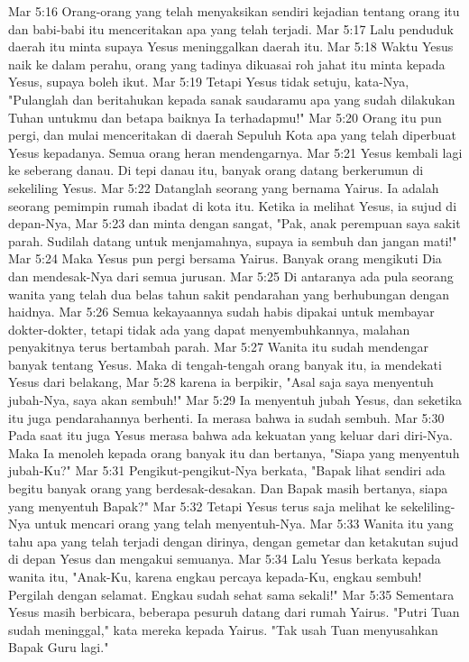 Mar 5:16  Orang-orang yang telah menyaksikan sendiri kejadian tentang orang itu dan babi-babi itu menceritakan apa yang telah terjadi.
Mar 5:17  Lalu penduduk daerah itu minta supaya Yesus meninggalkan daerah itu.
Mar 5:18  Waktu Yesus naik ke dalam perahu, orang yang tadinya dikuasai roh jahat itu minta kepada Yesus, supaya boleh ikut.
Mar 5:19  Tetapi Yesus tidak setuju, kata-Nya, "Pulanglah dan beritahukan kepada sanak saudaramu apa yang sudah dilakukan Tuhan untukmu dan betapa baiknya Ia terhadapmu!"
Mar 5:20  Orang itu pun pergi, dan mulai menceritakan di daerah Sepuluh Kota apa yang telah diperbuat Yesus kepadanya. Semua orang heran mendengarnya.
Mar 5:21  Yesus kembali lagi ke seberang danau. Di tepi danau itu, banyak orang datang berkerumun di sekeliling Yesus.
Mar 5:22  Datanglah seorang yang bernama Yairus. Ia adalah seorang pemimpin rumah ibadat di kota itu. Ketika ia melihat Yesus, ia sujud di depan-Nya,
Mar 5:23  dan minta dengan sangat, "Pak, anak perempuan saya sakit parah. Sudilah datang untuk menjamahnya, supaya ia sembuh dan jangan mati!"
Mar 5:24  Maka Yesus pun pergi bersama Yairus. Banyak orang mengikuti Dia dan mendesak-Nya dari semua jurusan.
Mar 5:25  Di antaranya ada pula seorang wanita yang telah dua belas tahun sakit pendarahan yang berhubungan dengan haidnya.
Mar 5:26  Semua kekayaannya sudah habis dipakai untuk membayar dokter-dokter, tetapi tidak ada yang dapat menyembuhkannya, malahan penyakitnya terus bertambah parah.
Mar 5:27  Wanita itu sudah mendengar banyak tentang Yesus. Maka di tengah-tengah orang banyak itu, ia mendekati Yesus dari belakang,
Mar 5:28  karena ia berpikir, "Asal saja saya menyentuh jubah-Nya, saya akan sembuh!"
Mar 5:29  Ia menyentuh jubah Yesus, dan seketika itu juga pendarahannya berhenti. Ia merasa bahwa ia sudah sembuh.
Mar 5:30  Pada saat itu juga Yesus merasa bahwa ada kekuatan yang keluar dari diri-Nya. Maka Ia menoleh kepada orang banyak itu dan bertanya, "Siapa yang menyentuh jubah-Ku?"
Mar 5:31  Pengikut-pengikut-Nya berkata, "Bapak lihat sendiri ada begitu banyak orang yang berdesak-desakan. Dan Bapak masih bertanya, siapa yang menyentuh Bapak?"
Mar 5:32  Tetapi Yesus terus saja melihat ke sekeliling-Nya untuk mencari orang yang telah menyentuh-Nya.
Mar 5:33  Wanita itu yang tahu apa yang telah terjadi dengan dirinya, dengan gemetar dan ketakutan sujud di depan Yesus dan mengakui semuanya.
Mar 5:34  Lalu Yesus berkata kepada wanita itu, "Anak-Ku, karena engkau percaya kepada-Ku, engkau sembuh! Pergilah dengan selamat. Engkau sudah sehat sama sekali!"
Mar 5:35  Sementara Yesus masih berbicara, beberapa pesuruh datang dari rumah Yairus. "Putri Tuan sudah meninggal," kata mereka kepada Yairus. "Tak usah Tuan menyusahkan Bapak Guru lagi."
